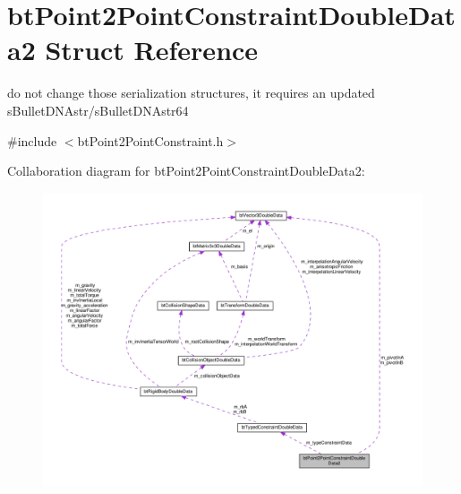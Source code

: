 \hypertarget{structbtPoint2PointConstraintDoubleData2}{}\section{bt\+Point2\+Point\+Constraint\+Double\+Data2 Struct Reference}
\label{structbtPoint2PointConstraintDoubleData2}


do not change those serialization structures, it requires an updated s\+Bullet\+D\+N\+Astr/s\+Bullet\+D\+N\+Astr64  




{\ttfamily \#include $<$bt\+Point2\+Point\+Constraint.\+h$>$}



Collaboration diagram for bt\+Point2\+Point\+Constraint\+Double\+Data2\+:
\nopagebreak
\begin{figure}[H]
\begin{center}
\leavevmode
\includegraphics[width=350pt]{structbtPoint2PointConstraintDoubleData2__coll__graph}
\end{center}
\end{figure}
